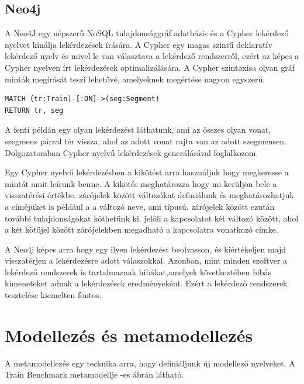  
 
\subsection{Neo4j}

A Neo4J egy népszerű NoSQL tulajdonsággráf adatbázis és a Cypher lekérdező nyelvet kínálja lekérdezések írására. A Cypher egy magas szintű deklaratív lekérdező nyelv és mivel le van választava a lekérdező rendszerről, ezért az képes a Cypher nyelven írt lekérdezések optimalizálására. A Cypher szintaxisa olyan gráf minták megírását teszi lehetővé, amelyeknek megértése nagyon egyszerű.


\begin{lstlisting}[style=cyphersmall]
MATCH (tr:Train)-[:ON]->(seg:Segment)
RETURN tr, seg	
\end{lstlisting}   

A fenti példán egy olyan lekérdezést láthatunk,  ami az összes olyan vonat, szegmens párral tér vissza, ahol az adott vonat rajta van az adott szegmensen.  Dolgozatomban Cypher nyelvű lekérdezések generálásával foglalkozom.

Egy Cypher nyelvű lekérdezésben a  kikötést arra használjuk hogy megkeresse a mintát amit leírunk benne.
A  kikötés meghatározza hogy mi kerüljön bele a visszatérési értékbe. \cypherStyle{()} zárójelek között változókat definiálunk és meghatározhatjuk a címéjüket is például  a  a változó neve, ami  típusú. {} zárójelek között ezután további tulajdonságokat köthetünk ki. \cypherStyle{-->} jelöli a kapcsolatot két változó között, ahol a két kötőjel között \cypherStyle{[]} zárójelekben megadható a kapcsolatra vonatkozó címke. 

A Neo4j képes arra hogy egy ilyen lekérdezést beolvasson, és kiértékeljen majd visszatérjen a lekérdezésre adott válaszokkal. Azonban, mint minden szoftver a lekérdező rendszerek is tartalmaznak hibákat,amelyek következtében hibás kimeneteket adnak a lekérdezések eredményeként. Ezért a lekérdező rendszerek tesztelése kiemelten fontos.

\section{Modellezés és metamodellezés}

A metamodellezés egy tecknika arra, hogy definiáljunk új modellező nyelveket. A Train Benchmark metamodellje  -es ábrán látható.

